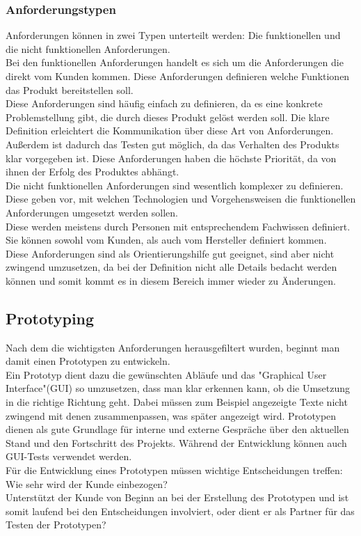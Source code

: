 \documentclass[10pt,a4paper]{article}
\begin{document}
\subsubsection{Anforderungstypen}
Anforderungen können in zwei Typen unterteilt werden: Die funktionellen und die nicht funktionellen Anforderungen.
\\Bei den funktionellen Anforderungen handelt es sich um die Anforderungen die direkt vom Kunden kommen. Diese Anforderungen definieren welche Funktionen das Produkt bereitstellen soll.
\\Diese Anforderungen sind häufig einfach zu definieren, da es eine konkrete Problemstellung gibt, die durch dieses Produkt gelöst werden soll. Die klare Definition erleichtert die Kommunikation über diese Art von Anforderungen. Außerdem ist dadurch das Testen gut möglich, da das Verhalten des Produkts klar vorgegeben ist. Diese Anforderungen haben die höchste Priorität, da von ihnen der Erfolg des Produktes abhängt.
\\Die nicht funktionellen Anforderungen sind wesentlich komplexer zu definieren. Diese geben vor, mit welchen Technologien und Vorgehensweisen die funktionellen Anforderungen umgesetzt werden sollen. 
\\Diese werden meistens durch Personen mit entsprechendem Fachwissen definiert. Sie können sowohl vom Kunden, als auch vom Hersteller definiert kommen.
\\Diese Anforderungen sind als Orientierungshilfe gut geeignet, sind aber nicht zwingend umzusetzen, da bei der Definition nicht alle Details bedacht werden können und somit kommt es in diesem Bereich immer wieder zu Änderungen.
\\
\subsection{Prototyping}
Nach dem die wichtigsten Anforderungen herausgefiltert wurden, beginnt man damit einen Prototypen zu entwickeln. 
\\Ein Prototyp dient dazu die gewünschten Abläufe und das "Graphical User Interface"(GUI) so umzusetzen, dass man klar erkennen kann, ob die Umsetzung in die richtige Richtung geht. Dabei müssen zum Beispiel angezeigte Texte nicht zwingend mit denen zusammenpassen, was später angezeigt wird. Prototypen dienen als gute Grundlage für interne und externe Gespräche über den aktuellen Stand und den Fortschritt des Projekts. Während der Entwicklung können auch GUI-Tests verwendet werden.
\\Für die Entwicklung eines Prototypen müssen wichtige Entscheidungen treffen: Wie sehr wird der Kunde einbezogen?
\\Unterstützt der Kunde von Beginn an bei der Erstellung des Prototypen und ist somit laufend bei den Entscheidungen involviert, oder dient er als Partner für das Testen der Prototypen? 
\end{document}
